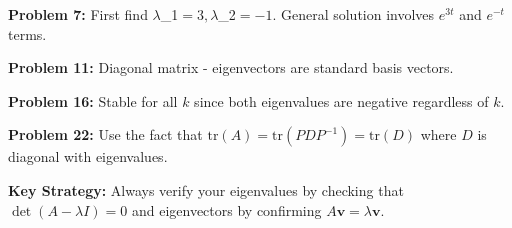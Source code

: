\documentclass[12pt]{article}
\begin{document}
\textbf{Problem 7:} First find $\lambda$_{1}$ = 3, \lambda$_{2}$ = -1$. General solution involves $e^{3t}$ and $e^{-t}$ terms.

\textbf{Problem 11:} Diagonal matrix - eigenvectors are standard basis vectors.

\textbf{Problem 16:} Stable for all $k$ since both eigenvalues are negative regardless of $k$.

\textbf{Problem 22:} Use the fact that $\text{tr}(A) = \text{tr}(PDP^{-1}) = \text{tr}(D)$ where $D$ is diagonal with eigenvalues.

\textbf{Key Strategy:} Always verify your eigenvalues by checking that $\det(A - \lambda I) = 0$ and eigenvectors by confirming $A\mathbf{v} = \lambda\mathbf{v}$.
\end{document}

